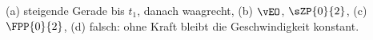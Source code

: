 (a) steigende Gerade bis $t_1$, danach waagrecht, (b) $\vEO$, $\sZP{0}{2}$, (c) $\FPP{0}{2}$, (d) falsch: ohne Kraft bleibt die Geschwindigkeit konstant.
